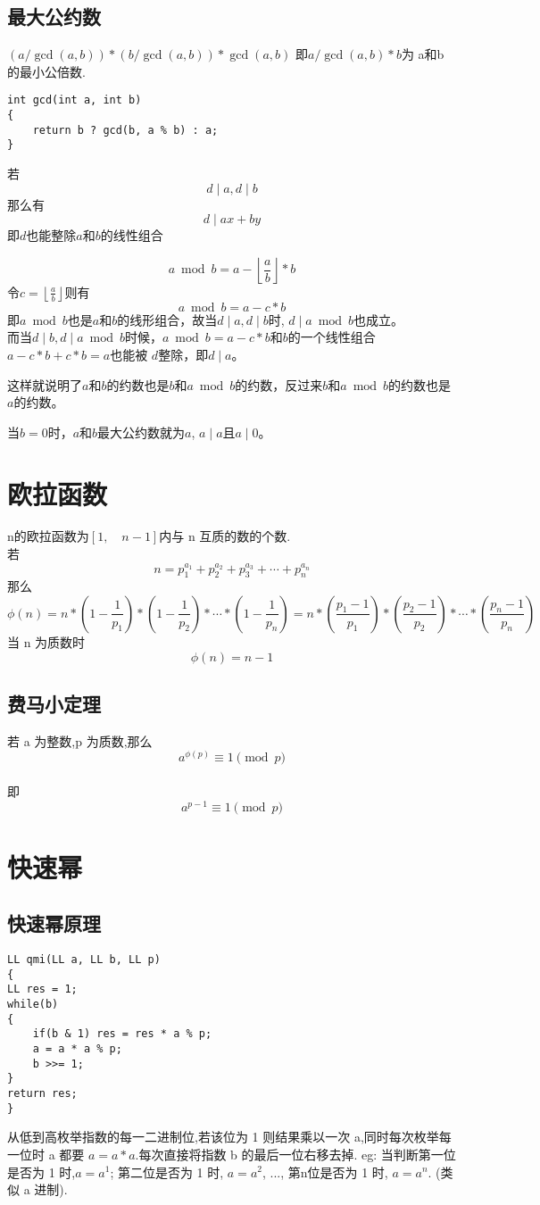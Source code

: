 \documentclass[]{book}
\begin{document}
\section{最大公约数}
$(a / \gcd(a, b)) * (b / \gcd(a, b))* \gcd(a, b)$ 即$a / \gcd(a, b) * b$为 a和b 的最小公倍数.
\begin{lstlisting}
int gcd(int a, int b)
{
    return b ? gcd(b, a % b) : a;
}
\end{lstlisting}
若
\[d \mid a, d \mid b\]
那么有
\[d \mid ax + by\]
即$d$也能整除$a$和$b$的线性组合

\[a \bmod b = a - \left\lfloor \frac{a}{b}\right\rfloor * b\]
令$c = \left\lfloor \frac{a}{b}\right\rfloor$则有
\[a \bmod b = a - c * b\]
即$a\bmod b$也是$a$和$b$的线形组合，故当$d\mid a, d\mid b$时, $d \mid a \bmod b$也成立。\\
而当$d\mid b, d\mid a\bmod b$时候，$a\bmod b = a - c * b$和$b$的一个线性组合$a - c*b + c * b = a$也能被 $d$整除，即$d\mid a$。

这样就说明了$a$和$b$的约数也是$b$和$a\bmod b$的约数，反过来$b$和$a\bmod b$的约数也是$a$的约数。

当$b=0$时，$a$和$b$最大公约数就为$a$, $a \mid a$且$a \mid 0$。
\chapter{欧拉函数}
n的欧拉函数为$[1,\quad n - 1]$内与 n 互质的数的个数.\\
若 
\[n = p_{1}^{a_{1}} + p_{2}^{a_{2}} + p_{3}^{a_{3}} +\cdots + p_{n}^{a_{n}}\]
那么
\[\phi(n) = n * (1 - \frac{1}{p_{1}}) * (1 - \frac{1}{p_{2}}) *\cdots* (1 - \frac{1}{p_{n}}) = 
n*(\frac{p_{1} - 1}{p_{1}})*(\frac{p_{2} - 1}{p_{2}})*\cdots *(\frac{p_{n} - 1}{p_{n}})\]
当 n 为质数时
\[\phi(n) = n - 1\]

\section{费马小定理}
若 a 为整数,p 为质数,那么
\[a^{\phi(p)}\equiv 1 \pmod{p}\]\\即
\[a^{p-1}\equiv 1 \pmod{p}\]
\chapter{快速幂}
\section{快速幂原理}
\begin{lstlisting}
LL qmi(LL a, LL b, LL p)
{
LL res = 1;
while(b)
{
    if(b & 1) res = res * a % p;
    a = a * a % p;
    b >>= 1;
}
return res;
}
\end{lstlisting}
从低到高枚举指数的每一二进制位,若该位为 1 则结果乘以一次 a,同时每次枚举每一位时 a 都要 $a = a * a$.每次直接将指数 b 的最后一位右移去掉.
eg: 当判断第一位是否为 1 时,$a = a^{1}$; 第二位是否为 1 时, $a = a^{2}$, ..., 第n位是否为 1 时, $a = a^{n}$. (类似 a 进制).
\end{document}

